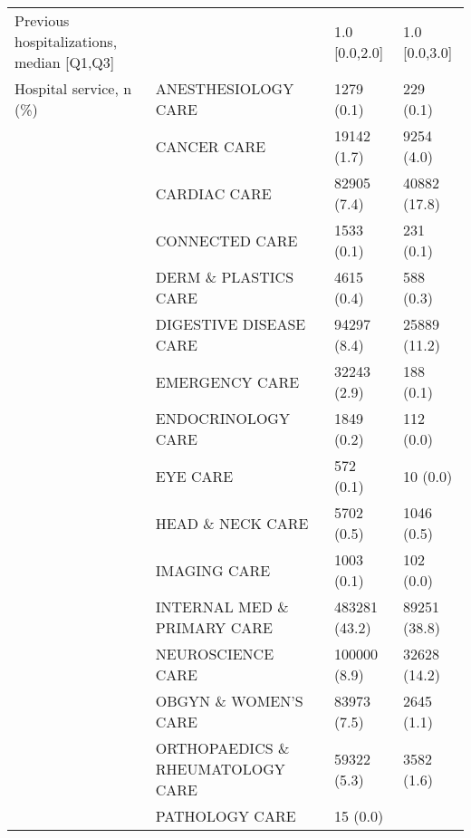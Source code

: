 \begin{tabular}{llll}
Previous hospitalizations, median [Q1,Q3] &   &                         1.0 [0.0,2.0] &     1.0 [0.0,3.0] \\
Hospital service, n (\%) & ANESTHESIOLOGY CARE &                            1279 (0.1) &         229 (0.1) \\
                                       & CANCER CARE &                           19142 (1.7) &        9254 (4.0) \\
                                       & CARDIAC CARE &                           82905 (7.4) &      40882 (17.8) \\
                                       & CONNECTED CARE &                            1533 (0.1) &         231 (0.1) \\
                                       & DERM \& PLASTICS CARE &                            4615 (0.4) &         588 (0.3) \\
                                       & DIGESTIVE DISEASE CARE &                           94297 (8.4) &      25889 (11.2) \\
                                       & EMERGENCY CARE &                           32243 (2.9) &         188 (0.1) \\
                                       & ENDOCRINOLOGY CARE &                            1849 (0.2) &         112 (0.0) \\
                                       & EYE CARE &                             572 (0.1) &          10 (0.0) \\
                                       & HEAD \& NECK CARE &                            5702 (0.5) &        1046 (0.5) \\
                                       & IMAGING CARE &                            1003 (0.1) &         102 (0.0) \\
                                       & INTERNAL MED \& PRIMARY CARE &                         483281 (43.2) &      89251 (38.8) \\
                                       & NEUROSCIENCE CARE &                          100000 (8.9) &      32628 (14.2) \\
                                       & OBGYN \& WOMEN'S CARE &                           83973 (7.5) &        2645 (1.1) \\
                                       & ORTHOPAEDICS \& RHEUMATOLOGY CARE &                           59322 (5.3) &        3582 (1.6) \\
                                       & PATHOLOGY CARE &                              15 (0.0) &                   \\

\end{tabular}
